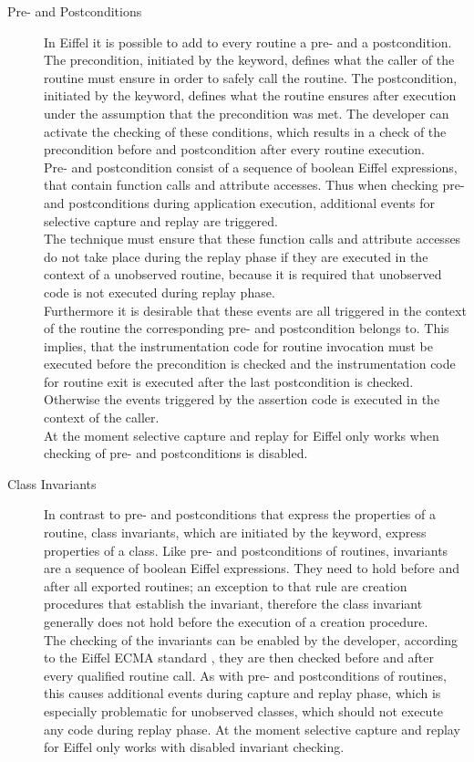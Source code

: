 \begin{description}
 \item [Pre- and Postconditions] In Eiffel it is possible to add to every routine a pre- and a postcondition. The precondition, initiated by the  keyword, defines what the caller of the routine must ensure in order to safely call the routine. The postcondition, initiated by the  keyword, defines what the routine ensures after execution under the assumption that the precondition was met. The developer can activate the checking of these conditions, which results in a check of the precondition before and postcondition after every routine execution.\\
 Pre- and postcondition consist of a sequence of boolean Eiffel expressions, that contain function calls and attribute accesses. Thus when checking pre- and postconditions during application execution, additional events for selective capture and replay are triggered.\\
The technique must ensure that these function calls and attribute accesses do not take place during the replay phase if they are executed in the context of a unobserved routine, because it is required that unobserved code is not executed during replay phase. \\
Furthermore it is desirable that these events are all triggered in the context of the routine the corresponding pre- and postcondition belongs to. This implies, that the instrumentation code for routine invocation must be executed before the precondition is checked and the instrumentation code for routine exit is executed after the last postcondition is checked. Otherwise the events triggered by the assertion code is executed in the context of the caller.\\
At the moment selective capture and replay for Eiffel only works when checking of pre- and postconditions is disabled.

 \item [Class Invariants] In contrast to pre- and postconditions that express the properties of a routine, class invariants, which are initiated by the  keyword, express properties of a class. Like pre- and postconditions of routines, invariants are a sequence of boolean Eiffel expressions. They need to hold before and after all exported routines; an exception to that rule are creation procedures that establish the invariant, therefore the class invariant generally does not hold before the execution of a creation procedure.\\
The checking of the invariants can be enabled by the developer, according to the Eiffel ECMA standard \cite{Eiffel-ECMA}, they are then checked before and after every qualified routine call. As with pre- and postconditions of routines, this causes additional events during capture and replay phase, which is especially problematic for unobserved classes, which should not execute any code during replay phase. At the moment selective capture and replay for Eiffel only works with disabled invariant checking.


\end{description}
